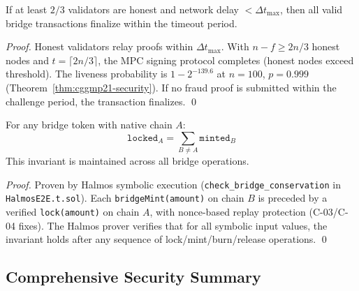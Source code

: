 \begin{theorem}[Liveness]
If at least $2/3$ validators are honest and network delay $< \Delta t_{\text{max}}$, then all valid bridge transactions finalize within the timeout period.
\end{theorem}

\begin{proof}
Honest validators relay proofs within $\Delta t_{\text{max}}$. With $n - f \geq 2n/3$ honest nodes and $t = \lceil 2n/3 \rceil$, the MPC signing protocol completes (honest nodes exceed threshold). The liveness probability is $1 - 2^{-139.6}$ at $n = 100$, $p = 0.999$ (Theorem~\ref{thm:cggmp21-security}). If no fraud proof is submitted within the challenge period, the transaction finalizes. \qed
\end{proof}

\begin{theorem}
For any bridge token with native chain $A$:
\begin{equation}
\texttt{locked}_A = \sum_{B \neq A} \texttt{minted}_B
\end{equation}
This invariant is maintained across all bridge operations.
\end{theorem}

\begin{proof}
Proven by Halmos symbolic execution (\texttt{check\_bridge\_conservation} in \texttt{HalmosE2E.t.sol}). Each \texttt{bridgeMint(amount)} on chain $B$ is preceded by a verified \texttt{lock(amount)} on chain $A$, with nonce-based replay protection (C-03/C-04 fixes). The Halmos prover verifies that for all symbolic input values, the invariant holds after any sequence of lock/mint/burn/release operations. \qed
\end{proof}

\subsection{Comprehensive Security Summary}

